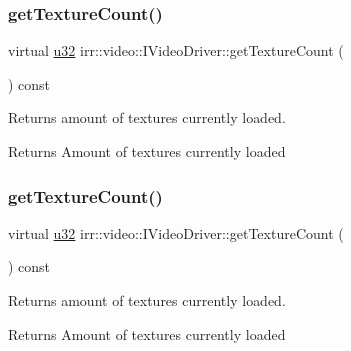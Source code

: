 \subsubsection{\texorpdfstring{get\+Texture\+Count()}{getTextureCount()}\hspace{0.1cm}{\footnotesize\ttfamily [1/2]}}
{\footnotesize\ttfamily virtual \hyperlink{namespaceirr_a0416a53257075833e7002efd0a18e804}{u32} irr\+::video\+::\+I\+Video\+Driver\+::get\+Texture\+Count (\begin{DoxyParamCaption}{ }\end{DoxyParamCaption}) const\hspace{0.3cm}{\ttfamily [pure virtual]}}



Returns amount of textures currently loaded. 

\begin{DoxyReturn}{Returns}
Amount of textures currently loaded 
\end{DoxyReturn}
\mbox{\label{classirr_1_1video_1_1IVideoDriver_a4c3f976980dd8387db37feca8c8e2d73}} 
\subsubsection{\texorpdfstring{get\+Texture\+Count()}{getTextureCount()}\hspace{0.1cm}{\footnotesize\ttfamily [2/2]}}
{\footnotesize\ttfamily virtual \hyperlink{namespaceirr_a0416a53257075833e7002efd0a18e804}{u32} irr\+::video\+::\+I\+Video\+Driver\+::get\+Texture\+Count (\begin{DoxyParamCaption}{ }\end{DoxyParamCaption}) const\hspace{0.3cm}{\ttfamily [pure virtual]}}



Returns amount of textures currently loaded. 

\begin{DoxyReturn}{Returns}
Amount of textures currently loaded 
\end{DoxyReturn}
\mbox{\label{classirr_1_1video_1_1IVideoDriver_ae64d474cbca38f64f2dbb8fcacb1a035}} 
